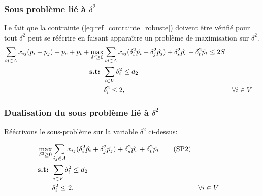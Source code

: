 \documentclass{article}
\begin{document}
\subsubsection{Sous problème lié à $\delta^{2}$}

Le fait que la contrainte (\ref{eq:ref_contrainte_robuste}) doivent être vérifié pour tout $\delta^{2}$ peut se réécrire en faisant apparaître un problème de maximisation sur $\delta^{2}$.
\begin{align}
  \sum_{ij \in A} x_{ij} (p_i + p_j) + p_s + p_t + 
    \max_{\delta^{2} \geq 0} & \sum_{ij \in A} x_{ij}(\delta^{2}_{i} \hat{p_i} + \delta^{2}_{j} \hat{p_j}) + \delta^{2}_{s} \hat{p_s} + \delta^{2}_{t} \hat{p_t} \leq 2S \\
     \textbf{s.t: } & \sum_{i \in V} \delta^{2}_{i} \leq d_2 \notag \\
     & \delta^{2}_{i} \leq 2, && \forall i \in V \notag
\end{align}


\subsubsection{Dualisation du sous problème lié à $\delta^{2}$}

Réécrivons le sous-problème sur la variable $\delta^{2}$ ci-dessus:

\begin{align}
    \max_{\delta^{2} \geq 0} & \sum_{ij \in A} x_{ij}(\delta^{2}_{i} \hat{p_i} + \delta^{2}_{j} \hat{p_j}) + \delta^{2}_{s} \hat{p_s} + \delta^{2}_{t} \hat{p_t} \tag{SP2} \label{eq:sous-prob-2}\\
     \textbf{s.t: } & \sum_{i \in V} \delta^{2}_{i} \leq d_2 \notag \\
     & \delta^{2}_{i} \leq 2, && \forall i \in V \notag
\end{align}
\end{document}
